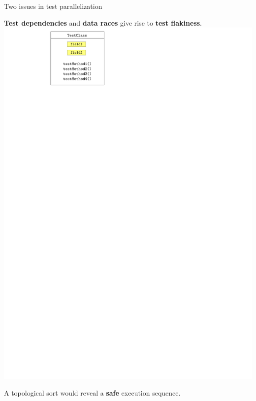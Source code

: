 \documentclass{beamer}
\begin{document}
\begin{frame}{Two issues in test parallelization}
	\begin{center}
{\color{blue}\textbf{Test dependencies} {\color{black}and} \textbf{data races}} give rise to {\color{red}\textbf{test flakiness}}.
		\includegraphics[width=0.8\linewidth,page=4]{images/flakes.pdf}
	\end{center}
{\color{white}
\centering
A topological sort would reveal a {\textbf{safe}} execution sequence.}
\end{frame}
\end{document}
